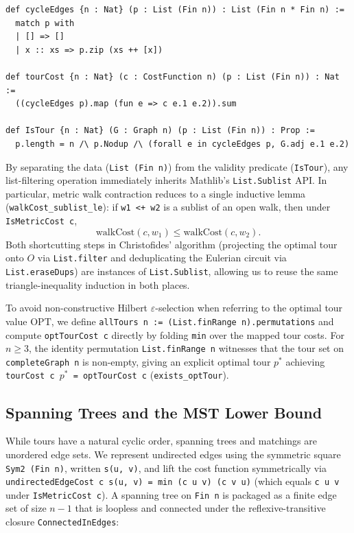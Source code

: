 \noindent\begin{minipage}{\linewidth}
\begin{lstlisting}[language=lean4]
def cycleEdges {n : Nat} (p : List (Fin n)) : List (Fin n * Fin n) :=
  match p with
  | [] => []
  | x :: xs => p.zip (xs ++ [x])

def tourCost {n : Nat} (c : CostFunction n) (p : List (Fin n)) : Nat :=
  ((cycleEdges p).map (fun e => c e.1 e.2)).sum

def IsTour {n : Nat} (G : Graph n) (p : List (Fin n)) : Prop :=
  p.length = n /\ p.Nodup /\ (forall e in cycleEdges p, G.adj e.1 e.2)
\end{lstlisting}
\end{minipage}
By separating the data (\texttt{List (Fin n)}) from the validity predicate (\texttt{IsTour}), any list-filtering operation immediately inherits Mathlib's \texttt{List.Sublist} API. In particular, metric walk contraction reduces to a single inductive lemma (\texttt{walkCost\_sublist\_le}): if \texttt{w1 <+ w2} is a sublist of an open walk, then under \texttt{IsMetricCost c},
\begin{equation}
  \mathrm{walkCost}(c, w_1) \le \mathrm{walkCost}(c, w_2).
\end{equation}
Both shortcutting steps in Christofides' algorithm (projecting the optimal tour onto $O$ via \texttt{List.filter} and deduplicating the Eulerian circuit via \texttt{List.eraseDups}) are instances of \texttt{List.Sublist}, allowing us to reuse the same triangle-inequality induction in both places.

To avoid non-constructive Hilbert $\varepsilon$-selection when referring to the optimal tour value $\mathrm{OPT}$, we define \texttt{allTours n := (List.finRange n).permutations} and compute \texttt{optTourCost c} directly by folding \texttt{min} over the mapped tour costs. For $n \ge 3$, the identity permutation \texttt{List.finRange n} witnesses that the tour set on \texttt{completeGraph n} is non-empty, giving an explicit optimal tour $p^*$ achieving \texttt{tourCost c $p^*$ = optTourCost c} (\texttt{exists\_optTour}).

\subsection{Spanning Trees and the MST Lower Bound}

While tours have a natural cyclic order, spanning trees and matchings are unordered edge sets. We represent undirected edges using the symmetric square \texttt{Sym2 (Fin n)}, written \texttt{s(u, v)}, and lift the cost function symmetrically via \texttt{undirectedEdgeCost c s(u, v) = min (c u v) (c v u)} (which equals \texttt{c u v} under \texttt{IsMetricCost c}). A spanning tree on \texttt{Fin n} is packaged as a finite edge set of size $n-1$ that is loopless and connected under the reflexive-transitive closure \texttt{ConnectedInEdges}:

